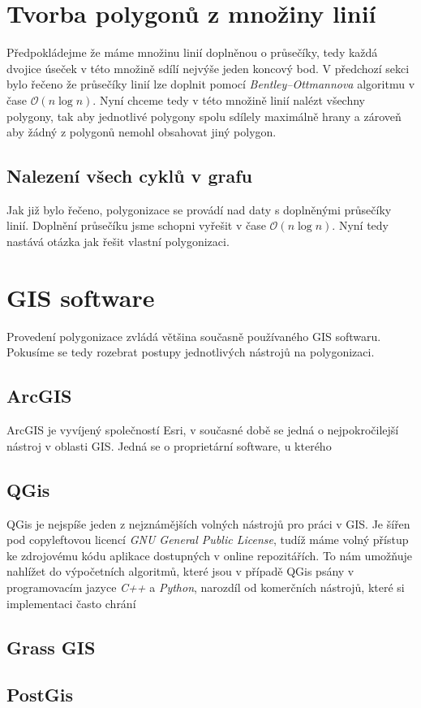 \section{Tvorba polygonů z množiny linií}
Předpokládejme že máme množinu linií doplněnou o průsečíky, tedy každá dvojice úseček v této množině sdílí nejvýše jeden koncový bod. V předchozí sekci bylo řečeno že průsečíky linií lze doplnit pomocí \textit{Bentley–Ottmannova} algoritmu v čase $\mathcal{O}(n\log{}n)$. Nyní chceme tedy v této množině linií nalézt všechny polygony, tak aby jednotlivé polygony spolu sdílely maximálně hrany a zároveň aby žádný z polygonů nemohl obsahovat jiný polygon.
	
\subsection{Nalezení všech cyklů v grafu}




Jak již bylo řečeno, polygonizace se provádí nad daty s doplněnými průsečíky linií. Doplnění průsečíku jsme schopni vyřešit v čase $\mathcal{O}(n\log{}n)$. Nyní tedy nastává otázka jak řešit vlastní polygonizaci.


\section{GIS software}
Provedení polygonizace zvládá většina současně používaného GIS softwaru. Pokusíme se tedy rozebrat postupy jednotlivých nástrojů na polygonizaci.

\subsection{ArcGIS}
ArcGIS je vyvíjený společností Esri, v současné době se jedná o nejpokročilejší nástroj v oblasti GIS. Jedná se o proprietární software, u kterého 


\subsection{QGis}
QGis je nejspíše jeden z nejznámějších volných nástrojů pro práci v GIS. Je šířen pod copyleftovou  licencí \textit{GNU General Public License}, tudíž máme volný přístup ke zdrojovému kódu aplikace dostupných v online repozitářích. To nám umožňuje nahlížet do výpočetních algoritmů, které jsou v případě QGis psány v programovacím jazyce \textit{C++} a \textit{Python}, narozdíl od komerčních nástrojů, které si implementaci často chrání

\subsection{Grass GIS}

\subsection{PostGis}
